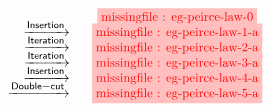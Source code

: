 \setlength{\fboxsep}{2pt}
\setlength{\arraycolsep}{0pt}
\newcommand{\vsp}{\vspace{-0.5em}}
\newcommand{\stkf}{\tikzfig{0.9}{0.45}}
$$
\begin{array}{r@{\quad}c@{\vsp}}
                                  &\stkf{eg-peirce-law-0} \\
       \xstep{\mathsf{Insertion}}       &\stkf{eg-peirce-law-1-a} \\
       \xstep{\mathsf{Iteration}}      &\stkf{eg-peirce-law-2-a} \\
       \xstep{\mathsf{Iteration}}      &\stkf{eg-peirce-law-3-a} \\
       \xstep{\mathsf{Insertion}}       &\stkf{eg-peirce-law-4-a} \\
       \xstep{\mathsf{Double{-}cut}} &\stkf{eg-peirce-law-5-a} \\
\end{array}
$$
